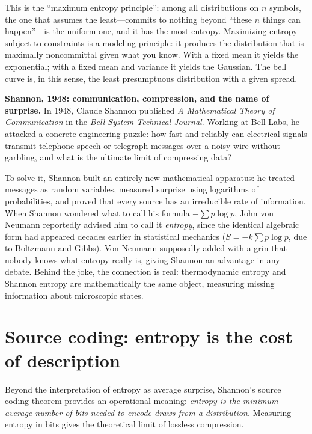 \begin{aestheticbox}
This is the ``maximum entropy principle'': among all distributions on $n$ symbols,
the one that assumes the least---commits to nothing beyond ``these $n$ things can happen''---is the
uniform one, and it has the most entropy. Maximizing entropy subject to constraints is a modeling
principle: it produces the distribution that is maximally noncommittal given what you know. With
a fixed mean it yields the exponential; with a fixed mean and variance it yields the Gaussian. The bell
curve is, in this sense, the least presumptuous distribution with a given spread.
\end{aestheticbox}

\begin{historybox}
\textbf{Shannon, 1948: communication, compression, and the name of surprise.}
In 1948, Claude Shannon published \emph{A Mathematical Theory of Communication} in the \emph{Bell System Technical Journal}. Working at Bell Labs, he attacked a concrete engineering puzzle: how fast and reliably can electrical signals transmit telephone speech or telegraph messages over a noisy wire without garbling, and what is the ultimate limit of compressing data?

To solve it, Shannon built an entirely new mathematical apparatus: he treated messages as random variables, measured surprise using logarithms of probabilities, and proved that every source has an irreducible rate of information. When Shannon wondered what to call his formula $-\sum p \log p$, John von Neumann reportedly advised him to call it \emph{entropy}, since the identical algebraic form had appeared decades earlier in statistical mechanics ($S = -k\sum p\log p$, due to Boltzmann and Gibbs). Von Neumann supposedly added with a grin that nobody knows what entropy really is, giving Shannon an advantage in any debate. Behind the joke, the connection is real: thermodynamic entropy and Shannon entropy are mathematically the same object, measuring missing information about microscopic states.
\end{historybox}

\section{Source coding: entropy is the cost of description}
\label{ch33:source-coding}

Beyond the interpretation of entropy as average surprise, Shannon's source coding theorem provides an
operational meaning: \emph{entropy is the minimum average number of bits needed to
encode draws from a distribution.} Measuring entropy in bits gives the theoretical limit of lossless compression.

